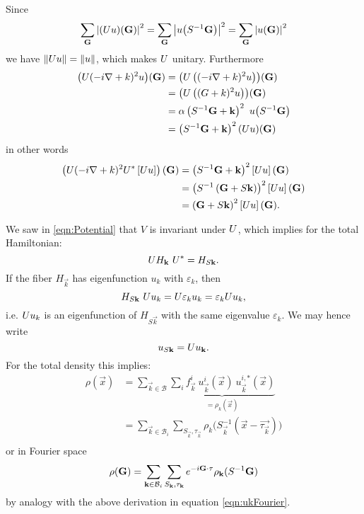 \documentclass[a4paper]{article}
\begin{document}
Since
\[ \sum_{\mathbf{G}} \left\lvert\left( U u \right)\!(\mathbf{G})\right\rvert^2
	= \sum_{\mathbf{G}} \left\lvert u\!\left( S^{-1} \mathbf{G} \right)\right\rvert^2
	= \sum_{\mathbf{G}} \left\lvert u\!\left(\mathbf{G} \right)\right\rvert^2
\]
we have $\left\lVert U u\right\rVert = \left\lVert u\right\rVert$, which makes $U$ unitary.
Furthermore
\begin{align*}
	\left( U (-i\nabla + k)^2 u\right)\!(\mathbf{G})
	&= \left(U \left((-i\nabla + k)^2 u\right)\right)\!(\mathbf{G}) \\
	&= \left(U \left((G + k)^2 u\right)\right)\!(\mathbf{G}) \\
	&= \alpha \left( S^{-1} \mathbf{G} + \mathbf{k} \right)^2
		\  u\!\left( S^{-1} \mathbf{G} \right)\\
	&= \left( S^{-1} \mathbf{G} + \mathbf{k} \right)^2 \left(U u\right)\!(\mathbf{G})
\end{align*}
in other words
\begin{align*}
	\left(U (-i\nabla + k)^2 U^\ast \left[U u\right]  \right)(\mathbf{G})
	&= \left( S^{-1} \mathbf{G} + \mathbf{k}\right)^2 \left[U u\right](\mathbf{G}) \\
	&= \left( S^{-1} \left(\mathbf{G} + S\mathbf{k}\right)\right)^2 \left[U u\right](\mathbf{G}) \\
	&= \left(\mathbf{G} + S\mathbf{k}\right)^2 \left[U u\right](\mathbf{G}).
\end{align*}

We saw in \eqref{eqn:Potential} that $V$ is invariant under $U$,
which implies for the total Hamiltonian:
\[ U H_{\mathbf{k}} \ U^\ast = H_{S\mathbf{k}}. \]
If the fiber $H_{\vec{k}}$ has eigenfunction $u_k$
with $\varepsilon_k$, then
\[
	H_{S\mathbf{k}} \ U u_k = U \varepsilon_k u_k = \varepsilon_k U u_k,
\]
i.e. $U u_k$ is an eigenfunction of $H_{S\vec{k}}$ with the same
eigenvalue $\varepsilon_k$. We may hence write
\[
	u_{S \mathbf{k}} = U u_{\mathbf{k}}.
\]
For the total density this implies:
\begin{align*}
	\rho(\vec{x}) &= \sum_{\vec{k} \in \mathcal{B}}
		\underbrace{\sum_{i} f_{\vec{k}}^i \
		u^i_{\vec{k}}(\vec{x}) \ u_{\vec{k}}^{i,\ast}(\vec{x})}_{= \rho_k(\vec{x})} \\
		&= \sum_{\vec{k} \in \mathcal{B}_i}
		\sum_{S_{\vec{k}}, \tau_{\vec{k}}}
		\rho_k\big(S_{\vec{k}}^{-1} (\vec{x} - \vec{\tau_{\vec{k}}})\big) \\
\end{align*}
or in Fourier space
\[ \rho(\mathbf{G}) = \sum_{\mathbf{k} \in \mathcal{B}_i} \sum_{S_{\mathbf{k}}, \tau_{\mathbf{k}}}
	e^{-i\mathbf{G}\cdot\mathbf{\tau}} \rho_{\mathbf{k}}(S^{-1}\mathbf{G})
\]
by analogy with the above derivation in equation \eqref{eqn:ukFourier}.
\end{document}
